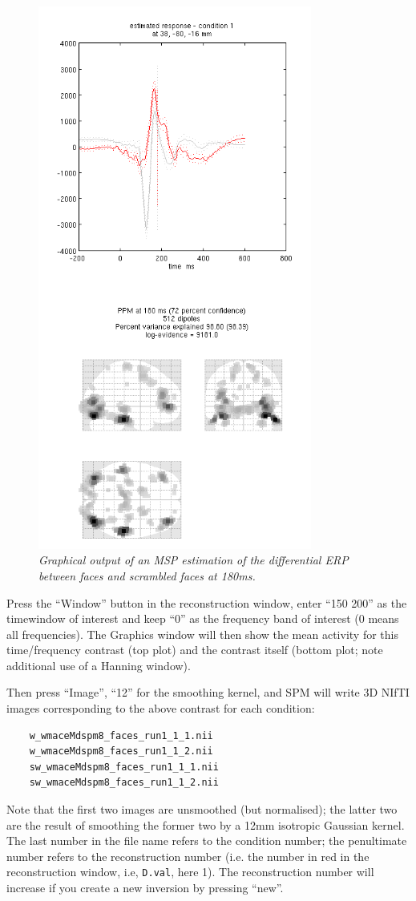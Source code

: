 \begin{figure}
\begin{center}
\includegraphics[width=90mm]{multimodal/figures/eeg_msp.png}
\caption{\em Graphical output of an MSP estimation of the differential ERP between faces and scrambled faces at 180ms. \label{multimodal:fig:9}}
\end{center}
\end{figure}

Press the ``Window'' button in the reconstruction window, enter ``150 200'' as the timewindow of interest and keep ``0'' as the frequency band of interest (0 means all frequencies). The Graphics window will then show the mean activity for this time/frequency contrast (top plot) and the contrast itself (bottom plot; note additional use of a Hanning window).

Then press ``Image'', ``12'' for the smoothing kernel, and SPM will write 3D NIfTI images corresponding to the above contrast for each condition:
\begin{verbatim}
    w_wmaceMdspm8_faces_run1_1_1.nii
    w_wmaceMdspm8_faces_run1_1_2.nii
    sw_wmaceMdspm8_faces_run1_1_1.nii
    sw_wmaceMdspm8_faces_run1_1_2.nii
\end{verbatim}
Note that the first two images are unsmoothed (but normalised); the latter two are the result of smoothing the former two by a 12mm isotropic Gaussian kernel. The last number in the file name refers to the condition number; the penultimate number refers to the reconstruction number (i.e. the number in red in the reconstruction window, i.e, \texttt{D.val}, here 1). The reconstruction number will increase if you create a new inversion by pressing ``new''.

